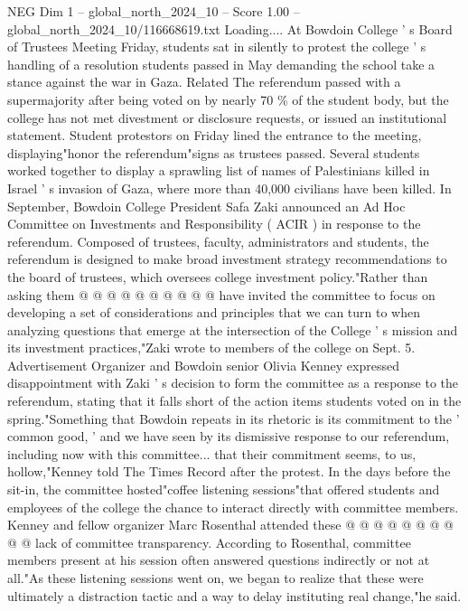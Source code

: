 \begin{textsample}{NEG Dim 1 – global\_north\_2024\_10 – Score 1.00 – global\_north\_2024\_10/116668619.txt}  \label{ex:f1_neg_073}
Loading....
At Bowdoin College ' s Board of Trustees Meeting Friday, students sat in silently to protest the college ' s handling of a resolution students passed in May demanding the school take a stance against the war in Gaza.
Related The referendum passed with a supermajority after being voted on by nearly 70 \% of the student body, but the college has not met divestment or disclosure requests, or issued an institutional statement.
Student protestors on Friday lined the entrance to the meeting, displaying"honor the referendum"signs as trustees passed.
Several students worked together to display a sprawling list of names of Palestinians killed in Israel ' s invasion of Gaza, where more than 40,000 civilians have been killed.
In September, Bowdoin College President Safa Zaki announced an Ad Hoc Committee on Investments and Responsibility ( ACIR ) in response to the referendum.
Composed of trustees, faculty, administrators and students, the referendum is designed to make broad investment strategy recommendations to the board of trustees, which oversees college investment policy."Rather than asking them @ @ @ @ @ @ @ @ @ @ have invited the committee to focus on developing a set of considerations and principles that we can turn to when analyzing questions that emerge at the intersection of the College ' s mission and its investment practices,"Zaki wrote to members of the college on Sept. 5.
Advertisement Organizer and Bowdoin senior Olivia Kenney expressed disappointment with Zaki ' s decision to form the committee as a response to the referendum, stating that it falls short of the action items students voted on in the spring."Something that Bowdoin repeats in its rhetoric is its commitment to the ' common good, ' and we have seen by its dismissive response to our referendum, including now with this committee... that their commitment seems, to us, hollow,"Kenney told The Times Record after the protest.
In the days before the sit-in, the committee hosted"coffee listening sessions"that offered students and employees of the college the chance to interact directly with committee members.
Kenney and fellow organizer Marc Rosenthal attended these @ @ @ @ @ @ @ @ @ @ lack of committee transparency.
According to Rosenthal, committee members present at his session often answered questions indirectly or not at all."As these listening sessions went on, we began to realize that these were ultimately a distraction tactic and a way to delay instituting real change,"he said.

\end{textsample}
